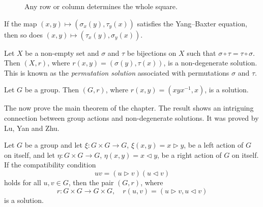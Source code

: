 \begin{figure}
\centering
{}
\caption{Any row or column determines the whole square.}
\label{fig:braid}
\end{figure}

\begin{example}
If the map $(x,y)\mapsto(\sigma_x(y),\tau_y(x))$ satisfies the Yang--Baxter equation, then 
so does $(x,y)\mapsto (\tau_x(y),\sigma_y(x))$. 
\end{example}

\begin{example}
\label{exa:Lyubashenko}
Let $X$ be a non-empty set and $\sigma$ and $\tau$ be 
bijections on $X$ such that $\sigma\circ\tau=\tau\circ\sigma$. Then 
$(X,r)$, where $r(x,y)=(\sigma(y),\tau(x))$, is a non-degenerate solution. 
This is known as the \emph{permutation solution} associated
with permutations $\sigma$ and $\tau$. 
\end{example}
%

\begin{example}
\label{exa:Venkov}
Let $G$ be a group. Then $(G,r)$, where $r(x,y)=(xyx^{-1},x)$, is a solution. 
\end{example}

The now prove the main theorem of the chapter. The result
shows an intriguing connection between group actions and non-degenerate solutions. It 
was proved by Lu, Yan and Zhu. 

\begin{theorem}
\label{thm:LYZ}
Let $G$ be a group and let $\xi\colon G\times G\to G$, $\xi(x,y)=x\rhd y$,
be a left action of $G$ on itself, and 
let $\eta\colon G\times G\to G$, $\eta(x,y)=x\lhd y$, 
be a right action of $G$ on itself. If the compatibility condition
\[
uv=(u\rhd v)(u\lhd v)
\]
holds for all $u,v\in G$, then the pair $(G,r)$, where 
\[
r\colon G\times G\to G\times G,\quad
r(u,v)=(u\rhd v,u\lhd v)
\]
is a solution. 
\end{theorem}

